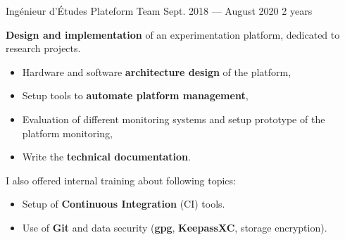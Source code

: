\jobposition%
{Ingénieur d’Études}%
{Plateform Team}
{Sept. 2018 --- August 2020}%
{2 years}%
{
	\textbf{Design and implementation} of an experimentation platform, dedicated
	to research projects.
	\vspace{0.5em}
	\begin{itemize}
		\item Hardware and software \textbf{architecture design} of the
		      platform,
		\item Setup tools to \textbf{automate platform management},
		\item Evaluation of different monitoring systems and setup
		      prototype of the platform monitoring,
		\item Write the \textbf{technical documentation}.
	\end{itemize}
	\vspace{0.5em}
	I also offered internal training about following topics:
	\vspace{0.5em}
	\begin{itemize}
		\item Setup of \textbf{Continuous Integration} (CI) tools.
		\item Use of \textbf{Git} and data security (\textbf{gpg},
		      \textbf{KeepassXC}, storage encryption).
	\end{itemize}
	\vspace{1em}

}
